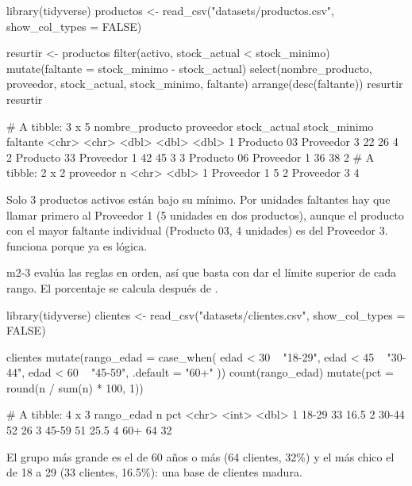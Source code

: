 \begin{rcode}
library(tidyverse)
productos <- read_csv("datasets/productos.csv", show_col_types = FALSE)

resurtir <- productos %
  filter(activo, stock_actual < stock_minimo) %
  mutate(faltante = stock_minimo - stock_actual) %
  select(nombre_producto, proveedor, stock_actual, stock_minimo,
         faltante) %
  arrange(desc(faltante))
resurtir
resurtir %
\end{rcode}
\begin{rsalida}
# A tibble: 3 x 5
  nombre_producto proveedor   stock_actual stock_minimo faltante
  <chr>           <chr>              <dbl>        <dbl>    <dbl>
1 Producto 03     Proveedor 3           22           26        4
2 Producto 33     Proveedor 1           42           45        3
3 Producto 06     Proveedor 1           36           38        2
# A tibble: 2 x 2
  proveedor       n
  <chr>       <dbl>
1 Proveedor 1     5
2 Proveedor 3     4
\end{rsalida}

Solo 3 productos activos están bajo su mínimo. Por unidades faltantes hay
que llamar primero al Proveedor 1 (5 unidades en dos productos), aunque el
producto con el mayor faltante individual (Producto 03, 4 unidades) es del
Proveedor 3.  funciona porque
 ya es lógica.


\begin{solucion}{m2-3}
 evalúa las reglas en orden, así que basta con dar el
límite superior de cada rango. El porcentaje se calcula después de
.
\end{solucion}

\begin{rcode}
library(tidyverse)
clientes <- read_csv("datasets/clientes.csv", show_col_types = FALSE)

clientes %
  mutate(rango_edad = case_when(
    edad < 30 ~ "18-29",
    edad < 45 ~ "30-44",
    edad < 60 ~ "45-59",
    .default  = "60+"
  )) %
  count(rango_edad) %
  mutate(pct = round(n / sum(n) * 100, 1))
\end{rcode}
\begin{rsalida}
# A tibble: 4 x 3
  rango_edad     n   pct
  <chr>      <int> <dbl>
1 18-29         33  16.5
2 30-44         52  26  
3 45-59         51  25.5
4 60+           64  32  
\end{rsalida}

El grupo más grande es el de 60 años o más (64 clientes, 32\%) y el más
chico el de 18 a 29 (33 clientes, 16.5\%): una base de clientes madura.


